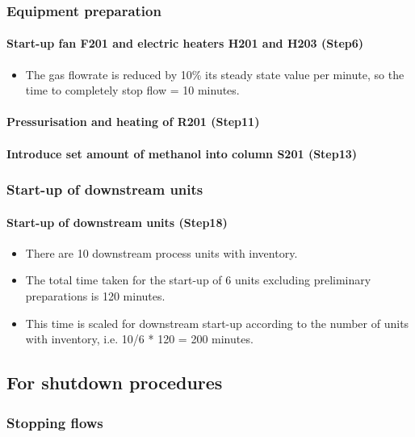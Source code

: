 \subsubsection{Equipment preparation}

\paragraph{Start-up fan F201 and electric heaters H201 and H203 (Step6)}
\begin{itemize}
        \item The gas flowrate is reduced by 10\% its steady state value per minute, so the time to completely stop flow = 10 minutes.
    \end{itemize}
    
\paragraph{Pressurisation and heating of R201 (Step11)}

\paragraph{Introduce set amount of methanol into column S201 (Step13)}


\subsubsection{Start-up of downstream units }
\paragraph{Start-up of downstream units (Step18)}
    \begin{itemize}
        \item There are 10 downstream process units with inventory.
        \item The total time taken for the start-up of 6 units excluding preliminary preparations is 120 minutes.
        \item This time is scaled for downstream start-up according to the number of units with inventory, i.e. 10/6 * 120 = 200 minutes.
    \end{itemize}

\subsection{For shutdown procedures}

\subsubsection{Stopping flows}
